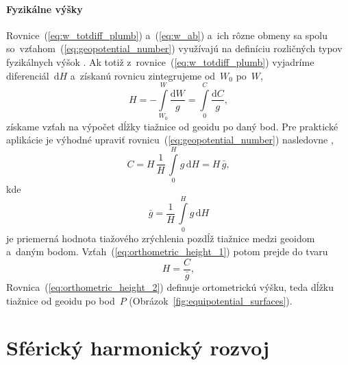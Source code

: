 \documentclass[a4paper,12pt]{book}
\newcommand{\diff}{\mathrm d}
\begin{document}
\subsubsection{Fyzikálne výšky}
\label{sec:physical_heights}

Rovnice~(\ref{eq:w_totdiff_plumb}) a~(\ref{eq:w_ab}) a~ich rôzne obmeny sa 
spolu so~vzťahom~(\ref{eq:geopotential_number}) využívajú na definíciu 
rozličných typov fyzikálnych výšok \parencite[pozri 
napríklad][]{MoritzPhysicalGeodesy,SansoGeodeticHeights}.  Ak totiž 
z~rovnice~(\ref{eq:w_totdiff_plumb}) vyjadríme diferenciál~$\diff H$ a~získanú 
rovnicu zintegrujeme od~$W_0$ po~$W$,
%
\begin{equation}
\label{eq:orthometric_height_1}
H = -\int\limits_{W_0}^{W} \frac{\diff W}{g} = \int\limits_{0}^{C} \frac{\diff 
C}{g}{,}
\end{equation}
%
získame vzťah na výpočet dĺžky tiažnice od geoidu po daný bod.  Pre praktické 
aplikácie je výhodné upraviť rovnicu~(\ref{eq:geopotential_number}) nasledovne 
\parencite{MoritzPhysicalGeodesy},
%
\begin{equation}
C = H \, \frac{1}{H} \, \int\limits_0^H g \, \diff H = H \, \bar{g}{,}
\end{equation}
%
kde
%
\begin{equation}
\bar{g} = \frac{1}{H} \, \int\limits_0^H g \, \diff H
\end{equation}
%
je priemerná hodnota tiažového zrýchlenia pozdĺž tiažnice medzi geoidom a~daným 
bodom.  Vzťah~(\ref{eq:orthometric_height_1}) potom prejde do tvaru
%
\begin{equation}
\label{eq:orthometric_height_2}
H = \frac{C}{\bar{g}}{,}
\end{equation}
%
Rovnica~(\ref{eq:orthometric_height_2}) definuje ortometrickú výšku, teda dĺžku 
tiažnice od geoidu po bod~$P$ (Obrázok~\ref{fig:equipotential_surfaces}).







\chapter{Sférický harmonický rozvoj}
\label{sec:spherical_harmonic_expansion}
\end{document}
